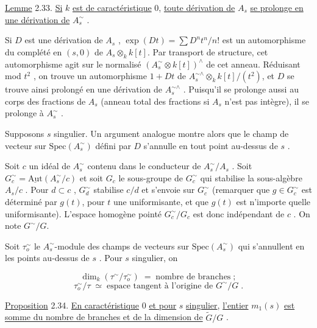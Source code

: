 
\underline{Lemme} 2.33. \underline{Si} $k$ \underline{est de caractéristique} $0$, \underline{toute dérivation de} $A_s$ \underline{se prolonge en une dérivation de} $A_s^{\sim}$ .

Si $D$ est une dérivation de $A_s$ , $\exp(Dt) = \sum D^n t^n/n!$ est un automorphisme du complété en $(s,0)$ de $A_s \otimes_k k[t]$. Par transport de structure, cet automorphisme agit sur le normalisé $(A_s^{\sim} \otimes k[t])^{\wedge}$ de cet anneau. Réduisant mod $t^2$ , on trouve un automorphisme $1 + Dt$ de $A_s^{\sim\wedge} \otimes_k k[t]/(t^2)$, et $D$ se trouve ainsi prolongé en une dérivation de $A_s^{\sim\wedge}$ . Puisqu'il se prolonge aussi au corps des fractions de $A_s$ (anneau total des fractions si $A_s$ n'est pas intègre), il se prolonge à $A_s^{\sim}$ .

Supposons $s$ singulier. Un argument analogue montre alors que le champ de vecteur sur $\mathrm{Spec}(A_s^{\sim})$ défini par $D$ s'annulle en tout point au-dessus de $s$ .

Soit $c$ un idéal de $A_s^{\sim}$ contenu dans le conducteur de $A_s^{\sim}/A_s$ . Soit $G_c^{\sim} = \underline{\mathrm{Aut}}(A_s^{\sim}/c)$ et soit $G_c$ le sous-groupe de $G_c^{\sim}$ qui stabilise la sous-algèbre $A_s/c$ . Pour $d \subset c$ , $G_d^{\sim}$ stabilise $c/d$ et s'envoie sur $G_c^{\sim}$ (remarquer que $g \in G_c^{\sim}$ est déterminé par $g(t)$, pour $t$ une uniformisante, et que $g(t)$ est n'importe quelle uniformisante). L'espace homogène pointé $G_c^{\sim}/G_c$ est donc indépendant de $c$ . On note $G^{\sim}/G$.

Soit $\tau_o^{\sim}$ le $A_s^{\sim}$-module des champs de vecteurs sur $\mathrm{Spec}(A_s^{\sim})$ qui s'annullent en les points au-dessus de $s$ . Pour $s$ singulier, on

\begin{equation*}
\dim_k(\tau^{\sim}/\tau_o^{\sim}) \;=\; \mbox{nombre de branches} \;;
\end{equation*}
\begin{equation*}
\tau_o^{\sim}/\tau \;\simeq\; \mbox{espace tangent à l'origine de } G^{\sim}/G \;.
\end{equation*}


\underline{Proposition} 2.34. \underline{En caractéristique} $0$ \underline{et pour} $s$ \underline{singulier}, \underline{l'entier} $m_1(s)$ \underline{est somme du nombre de branches et de la dimension de} $\widetilde{G}/G$ .


